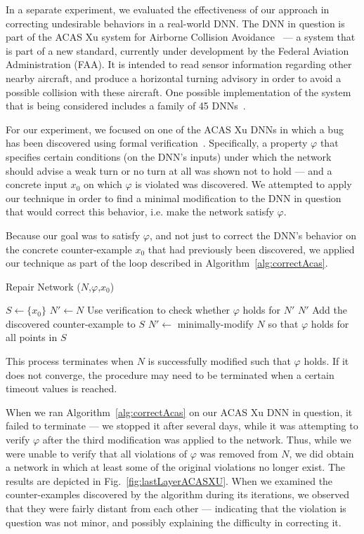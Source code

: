 \documentclass{easychair}
\begin{document}
In a separate experiment, we evaluated the effectiveness of our
approach in correcting undesirable behaviors in a real-world DNN. The
DNN in question is part of the ACAS Xu system for Airborne Collision
Avoidance~\cite{JuLoBrOwKo16} --- a system that is part of a new
standard, currently under development by the Federal Aviation
Administration (FAA). It is intended to
read sensor information regarding other nearby aircraft, and produce a
horizontal turning advisory in order to avoid a possible collision
with these aircraft. One possible implementation of the system that is
being considered includes a family of 45 DNNs~\cite{JuLoBrOwKo16}.

For our experiment, we focused on one of the ACAS Xu DNNs in which a
bug has been discovered using formal
verification~\cite{KaBaDiJuKo17Reluplex}. Specifically, a property
$\varphi$ that specifies certain conditions (on the DNN's inputs)
under which the network should advise a weak turn or no turn at all
was shown not to hold --- and a concrete input $x_0$ on which $\varphi$ is
violated was discovered. We attempted to apply our
technique in order to find a minimal modification to the DNN in question that
would correct this behavior, i.e. make the network satisfy $\varphi$.

Because our goal was to satisfy $\varphi$, and not just to correct the
DNN's behavior on the concrete counter-example $x_0$ that had previously
been discovered, we applied our technique as part of the loop
described in Algorithm~\ref{alg:correctAcas}.

\begin{algorithm}
\caption{Repair Network ($N$,$\varphi$,$x_0$)}
\begin{algorithmic}[1]
  \State $S\leftarrow \{x_0\}$
  \State $N'\leftarrow N$
  \State Use verification to check whether $\varphi$ holds for $N'$
    \State\Return $N'$
  \Else
    \State Add the discovered counter-example to $S$
    \State $N'\leftarrow$ minimally-modify $N$ so that $\varphi$
    holds for all points in $S$
    \EndIf
    \EndWhile
\end{algorithmic}
\label{alg:correctAcas}
\end{algorithm}

This process terminates when $N$ is successfully modified such
that $\varphi$ holds. If it does not converge, the procedure may need
to be terminated when a certain timeout values is reached.

When we ran Algorithm~\ref{alg:correctAcas} on our ACAS Xu DNN in
question, it failed to terminate --- we stopped it after several days, while it was attempting to verify $\varphi$ after the third modification was applied to the network. Thus, while we were unable to verify that all violations of $\varphi$ was removed from $N$, we did obtain a
network in which at least some of the original violations no longer
exist.  The results are depicted in
Fig.~\ref{fig:lastLayerACASXU}. When we examined
the counter-examples discovered by the algorithm during its
iterations, we observed that they were fairly distant from
each other --- indicating that the violation is question was not
minor, and possibly explaining the difficulty in correcting it.
\end{document}
